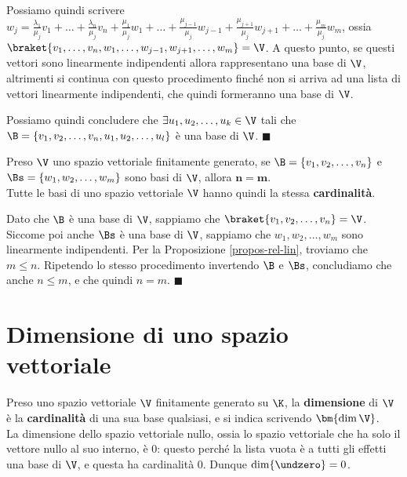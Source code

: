 \documentclass[11pt, a4paper, titlepage, oneside]{scrbook}
\begin{document}
\begin{enumerate}[label=\Roman*)]
\begin{enumerate}[label=\arabic*°]
        Possiamo quindi scrivere $w_j = \frac{\lambda_1}{\mu_j} v_1 + \ldots + \frac{\lambda_n}{\mu_j} v_n + \frac{\mu_1}{\mu_j} w_1 + \ldots + \frac{\mu_{j-1}}{\mu_j} w_{j-1} + \frac{\mu_{j+1}}{\mu_j} w_{j+1} + \ldots + \frac{\mu_m}{\mu_j} w_m$, ossia $\braket{v_1, \ldots, v_n, w_1, \ldots, w_{j-1}, w_{j+1}, \ldots, w_m} = \V$. 
        A questo punto, se questi vettori sono linearmente indipendenti allora rappresentano una base di $\V$, altrimenti si continua con questo procedimento finché non si arriva ad una lista di vettori linearmente indipendenti, che quindi formeranno una base di $\V$.
    \end{enumerate}
    Possiamo quindi concludere che $\exists u_1, u_2, \ldots, u_k \in \V$ tali che \\ $\B = \{v_1, v_2, \ldots, v_n, u_1, u_2, \ldots, u_l\}$ è una base di $\V$. $\blacksquare$
\end{enumerate}

\begin{Proposizione}[]
\label{propos-base-3}
Preso $\V$ uno spazio vettoriale finitamente generato, se $\B = \{v_1, v_2, \ldots, v_n\}$ e \mbox{$\Bs = \{w_1, w_2, \ldots, w_m\}$} sono basi di $\V$, allora $\bm{n = m}$. \\
Tutte le basi di uno spazio vettoriale $\V$ hanno quindi la stessa \textbf{cardinalità}.
\end{Proposizione}

\Dimostrazione \nopagebreak

Dato che $\B$ è una base di $\V$, sappiamo che $\braket{v_1, v_2, \ldots, v_n} = \V$. Siccome poi anche $\Bs$ è una base di $\V$, sappiamo che $w_1, w_2, \ldots, w_m$ sono linearmente indipendenti. Per la Proposizione \ref{propos-rel-lin}, troviamo che $m \leq n$. Ripetendo lo stesso procedimento invertendo $\B$ e $\Bs$, concludiamo che anche $n \leq m$, e che quindi $n = m$. $\blacksquare$

\section{Dimensione di uno spazio vettoriale}

\begin{Definizione}
\label{def-dim-spaz-vett}
Preso uno spazio vettoriale $\V$ finitamente generato su $\K$, la \textbf{dimensione} di $\V$ è la \textbf{cardinalità} di una sua base qualsiasi, e si indica scrivendo $\bm{\dim \V}$. \\
\NB La dimensione dello spazio vettoriale nullo, ossia lo spazio vettoriale che ha solo il vettore nullo al suo interno, è $0$: questo perché la lista vuota è a tutti gli effetti una base di $\V$, e questa ha cardinalità $0$. Dunque $\dim \{\undzero\} = 0$.
\end{Definizione}
\end{document}
